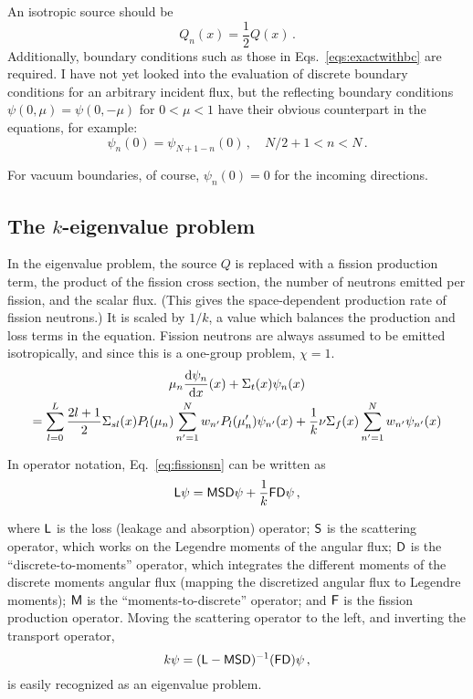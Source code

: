 \documentclass[]{SRJcommon}
\begin{document}
An isotropic source should be 
\begin{equation}
Q_n(x) = \frac{1}{2} Q(x) \,.
  \label{eq:isotropicsource}
\end{equation}
Additionally, boundary conditions such as those in
Eqs.~\eqref{eqs:exactwithbc} are required. I have not yet looked into the
evaluation of discrete boundary conditions for an arbitrary incident flux, but
the reflecting boundary conditions $\psi(0, \mu) = \psi(0, -\mu)$ for $0 < \mu
< 1$ have their obvious counterpart in the \SN{} equations, for example:
$$ \psi_{n}(0) = \psi_{N + 1 - n}(0) \,, \quad N/2 + 1 < n < N  \,.$$

For vacuum boundaries, of course, $\psi_{n}(0) = 0$ for the incoming directions.
\subsection{The $k$-eigenvalue problem}
In the eigenvalue problem, the source $Q$ is replaced with a fission production
term, the product of the fission cross section, the number of neutrons emitted
per fission, and the scalar flux. (This gives the space-dependent production
rate of fission neutrons.)
It is scaled by $1/k$, a value which balances the production and loss
terms in the equation. Fission neutrons are always assumed to be emitted
isotropically, and since this is a one-group problem, $\chi = 1$. 
\begin{multline}
  \mu_n \frac{\mathrm{d} \psi_n}{\mathrm{d} x}(x) + \Sigma_t(x) \psi_n(x) 
\\
  = \sum_{l=0}^{L}  \frac{2l+1}{2} \Sigma_{sl}(x) P_{l}(\mu_n)
  \sum_{n'=1}^{N} w_{n'} P_{l} (\mu_n') \psi_{n'}(x)
  + \frac{1}{k} \nu\Sigma_f(x) \sum_{n'=1}^{N} w_{n'} \psi_{n'}(x)
  \label{eq:fissionsn}
\end{multline}

In operator notation, Eq.~\eqref{eq:fissionsn} can be
written as
\begin{equation}
\mathsf{L} \psi = \mathsf{M} \mathsf{S} \mathsf{D} \psi +  \frac{1}{k} \mathsf{F} \mathsf{D} \psi \,,
  \label{eq:fissionoperator}
\end{equation}

where $\mathsf{L}$ is the loss (leakage and absorption) operator; 
$\mathsf{S}$ is the scattering operator, which works on the Legendre moments of
the angular flux; $\mathsf{D}$ is the ``discrete-to-moments'' operator, which
integrates
the different moments of the discrete moments angular flux (mapping the
discretized angular flux to Legendre moments); $\mathsf{M}$ is the
``moments-to-discrete'' operator; and $\mathsf{F}$ is the
fission production operator. Moving the scattering operator to the left, and
inverting the transport operator,
$$ k \psi = (\mathsf{L} - \mathsf{M} \mathsf{S} \mathsf{D} )^{-1}  (\mathsf{F} \mathsf{D}) \psi \,,$$
is easily recognized as an eigenvalue problem.
\end{document}

